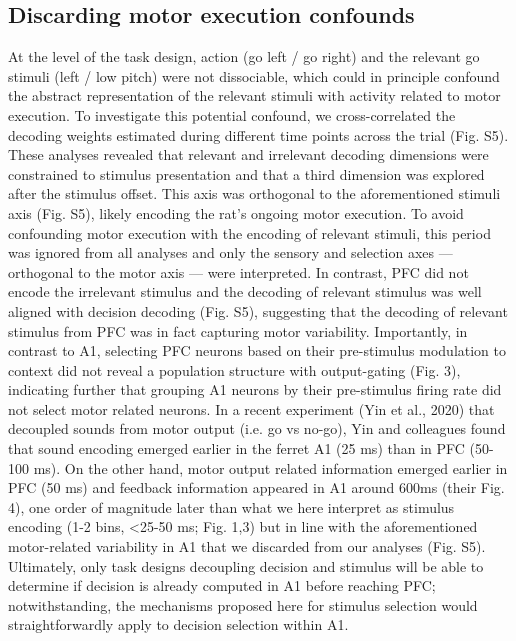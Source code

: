 \documentclass[12pt]{article}
\begin{document}
\subsection*{Discarding motor execution confounds}
At the level of the task design, action (go left / go right) and the relevant go stimuli (left / low pitch) were not dissociable, which could in principle confound the abstract representation of the relevant stimuli with activity related to motor execution. To investigate this potential confound, we cross-correlated the decoding weights estimated during different time points across the trial (Fig. S5). These analyses revealed that relevant and irrelevant decoding dimensions were constrained to stimulus presentation and that a third dimension was explored after the stimulus offset. This axis was orthogonal to the aforementioned stimuli axis (Fig. S5), likely encoding the rat’s ongoing motor execution. To avoid confounding motor execution with the encoding of relevant stimuli, this period was ignored from all analyses and only the sensory and selection axes — orthogonal to the motor axis — were interpreted. In contrast, PFC did not encode the irrelevant stimulus and the decoding of relevant stimulus was well aligned with decision decoding (Fig. S5), suggesting that the decoding of relevant stimulus from PFC was in fact capturing motor variability. Importantly, in contrast to A1, selecting PFC neurons based on their pre-stimulus modulation to context did not reveal a population structure with output-gating (Fig. 3), indicating further that grouping A1 neurons by their pre-stimulus firing rate did not select motor related neurons. In a recent experiment (Yin et al., 2020) that decoupled sounds from motor output (i.e. go vs no-go), Yin and colleagues found that sound encoding emerged earlier in the ferret A1 (25 ms) than in PFC (50-100 ms). On the other hand, motor output related information emerged earlier in PFC (50 ms) and feedback information appeared in A1 around 600ms (their Fig. 4), one order of magnitude later than what we here interpret as stimulus encoding (1-2 bins, <25-50 ms; Fig. 1,3) but in line with the aforementioned motor-related variability in A1 that we discarded from our analyses (Fig. S5). Ultimately, only task designs decoupling decision and stimulus will be able to determine if decision is already computed in A1 before reaching PFC; notwithstanding, the mechanisms proposed here for stimulus selection would straightforwardly apply to decision selection within A1. 
\end{document}
